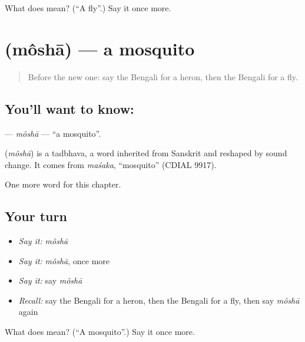 \begin{tcolorbox}[breakable,colback=teal!4,colframe=teal!35!black,title={Before you move on}]
What does  mean? (\textquotedblleft{}A fly\textquotedblright{}.) Say it once more.
\end{tcolorbox}
\section[\texorpdfstring{\bn{মশা} (môshā)}{মশা (môshā)}]{ (môshā) — a mosquito}

\label{lesson:BN-C122-mosha}



\begin{quote}
Before the new one: say the Bengali for a heron, then the Bengali for a fly.
\end{quote}

\subsection*{You'll want to know: }
\textbf{} — \emph{môshā} — \textquotedblleft{}a mosquito\textquotedblright{}.

\begin{cousinweb}
\textbf{} (\emph{môshā}) is a tadbhava, a word inherited from Sanskrit and reshaped by sound change. It comes from \emph{maśaka}, \textquotedblleft{}mosquito\textquotedblright{} (CDIAL 9917).
\end{cousinweb}

\begin{grammarlens}[title={What you've built}]
One more word for this chapter.
\end{grammarlens}

\subsection*{Your turn}
\begin{itemize}
\raggedright
  \item \emph{Say it:} \emph{môshā}
  \item \emph{Say it:} \emph{môshā}, once more
  \item \emph{Say it:} say \emph{môshā}
  \item \emph{Recall:} say the Bengali for a heron, then the Bengali for a fly, then say \emph{môshā} again
\end{itemize}

\begin{tcolorbox}[breakable,colback=teal!4,colframe=teal!35!black,title={Before you move on}]
What does  mean? (\textquotedblleft{}A mosquito\textquotedblright{}.) Say it once more.
\end{tcolorbox}
